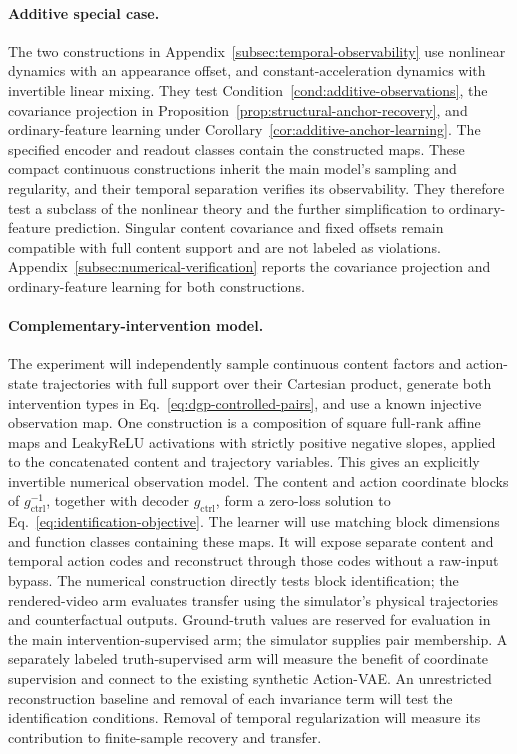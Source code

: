\paragraph{Additive special case.}
The two constructions in Appendix~\ref{subsec:temporal-observability}
use nonlinear dynamics with an appearance offset, and constant-acceleration
dynamics with invertible linear mixing. They test
Condition~\ref{cond:additive-observations}, the covariance projection in
Proposition~\ref{prop:structural-anchor-recovery}, and ordinary-feature
learning under Corollary~\ref{cor:additive-anchor-learning}.
The specified encoder and readout classes contain the constructed maps.
These compact continuous constructions inherit the main model's sampling
and regularity, and their temporal separation verifies its observability.
They therefore test a subclass of the nonlinear theory and the further
simplification to ordinary-feature prediction. Singular content covariance
and fixed offsets remain compatible with full content support and are not
labeled as violations. Appendix~\ref{subsec:numerical-verification} reports
the covariance projection and ordinary-feature learning for both constructions.

\paragraph{Complementary-intervention model.}
The experiment will independently sample continuous content factors and
action-state trajectories with full support over their Cartesian product,
generate both intervention types in Eq.~\ref{eq:dgp-controlled-pairs}, and
use a known injective observation map.
One construction is a composition of square full-rank affine maps and
LeakyReLU activations with strictly positive negative slopes, applied to
the concatenated content and trajectory variables.
This gives an explicitly invertible numerical observation model.
The content and action coordinate blocks of $g_{\mathrm{ctrl}}^{-1}$,
together with decoder $g_{\mathrm{ctrl}}$, form a zero-loss solution to
Eq.~\ref{eq:identification-objective}. The learner will use matching
block dimensions and function classes containing these maps.
It will expose separate content and temporal action codes and reconstruct
through those codes without a raw-input bypass.
The numerical construction directly tests block identification; the
rendered-video arm evaluates transfer using the simulator's physical
trajectories and counterfactual outputs.
Ground-truth values are reserved for evaluation in the main
intervention-supervised arm; the simulator supplies pair membership.
A separately labeled truth-supervised arm will measure the benefit of
coordinate supervision and connect to the existing synthetic Action-VAE.
An unrestricted reconstruction baseline and removal of each invariance
term will test the identification conditions. Removal of temporal
regularization will measure its contribution to finite-sample recovery
and transfer.

